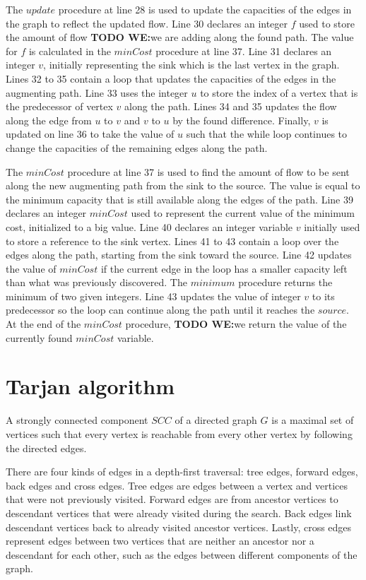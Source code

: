 \documentclass{l4proj}
\begin{document}
\noindent The $update$ procedure at line 28 is used to update the capacities of the edges in the graph to reflect the updated flow. Line 30 declares an integer $f$ used to store the amount of flow \textbf{TODO WE:}we are adding along the found path. The value for $f$ is calculated in the $minCost$ procedure at line 37. Line 31 declares an integer $v$, initially representing the sink which is the last vertex in the graph. Lines 32 to 35 contain a loop that updates the capacities of the edges in the augmenting path. Line 33 uses the integer $u$ to store the index of a vertex that is the predecessor of vertex $v$ along the path. Lines 34 and 35 updates the flow along the edge from $u$ to $v$ and $v$ to $u$ by the found difference. Finally, $v$ is updated on line 36 to take the value of $u$ such that the while loop continues to change the capacities of the remaining edges along the path.

\noindent The $minCost$ procedure at line 37 is used to find the amount of flow to be sent along the new augmenting path from the sink to the source. The value is equal to the minimum capacity that is still available along the edges of the path. Line 39 declares an integer $minCost$ used to represent the current value of the minimum cost, initialized to a big value. Line 40 declares an integer variable $v$ initially used to store a reference to the sink vertex. Lines 41 to 43 contain a loop over the edges along the path, starting from the sink toward the source. Line 42 updates the value of $minCost$ if the current edge in the loop has a smaller capacity left than what was previously discovered. The $minimum$ procedure returns the minimum of two given integers. Line 43 updates the value of integer $v$ to its predecessor so the loop can continue along the path until it reaches the $source$. At the end of the $minCost$ procedure, \textbf{TODO WE:}we return the value of the currently found $minCost$ variable.

\newpage

\section{Tarjan algorithm}
\noindent A strongly connected component $SCC$ of a directed graph $G$ is a maximal set of vertices such that every vertex is reachable from every other vertex by following the directed edges.

\noindent There are four kinds of edges in a depth-first traversal: tree edges, forward edges, back edges and cross edges. Tree edges are edges between a vertex and vertices that were not previously visited. Forward edges are from ancestor vertices to descendant vertices that were already visited during the search. Back edges link descendant vertices back to already visited ancestor vertices. Lastly, cross edges represent edges between two vertices that are neither an ancestor nor a descendant for each other, such as the edges between different components of the graph. 
\end{document}
